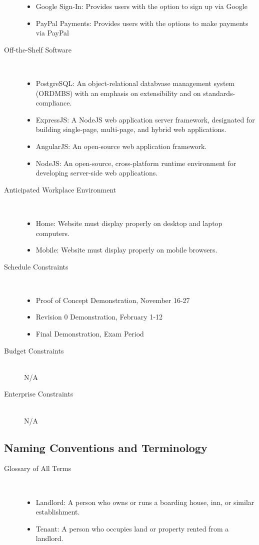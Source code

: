 \documentclass[12pt, titlepage]{article}
\begin{document}
\begin{description}
\begin{itemize}
    \item Google Sign-In: Provides users with the option to sign up via Google
    \item PayPal Payments: Provides users with the options to make payments
          via PayPal
    \end{itemize}
  \item[Off-the-Shelf Software] \hfill \\
    \begin{itemize}
    \item PostgreSQL: An object-relational databvase management system (ORDMBS)
      with an emphasis on extensibility and on standards-compliance.
    \item ExpressJS: A NodeJS web application server framework, designated for
      building single-page, multi-page, and hybrid web applications.
    \item AngularJS: An open-source web application framework.
    \item NodeJS: An open-source, cross-platform runtime environment for
      developing server-side web applications.
    \end{itemize}
  \item[Anticipated Workplace Environment] \hfill \\
    \begin{itemize}
    \item Home: Website must display properly on desktop and laptop computers.
    \item Mobile: Website must display properly on mobile browsers.
    \end{itemize}
  \item[Schedule Constraints] \hfill \\
    \begin{itemize}
    \item Proof of Concept Demonstration, November 16-27
    \item Revision 0 Demonstration, February 1-12
    \item Final Demonstration, Exam Period
    \end{itemize}
  \item[Budget Constraints] \hfill \\
    N/A
  \item[Enterprise Constraints] \hfill \\
    N/A
\end{description}
\subsection{Naming Conventions and Terminology} %
\begin{description}
  \item[Glossary of All Terms] \hfill \\
    \begin{itemize}
    \item Landlord: A person who owns or runs a boarding house, inn, or similar
      establishment.
    \item Tenant: A person who occupies land or property rented from a landlord.
    \end{itemize}
\end{description}
\end{document}
